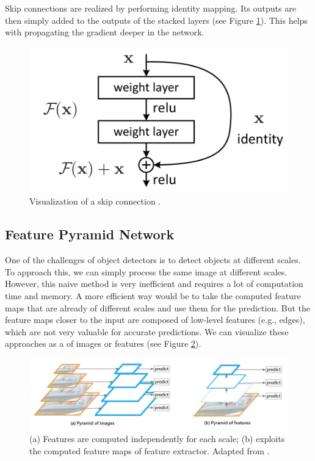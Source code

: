 Skip connections are realized by performing identity mapping. Its outputs are then simply added to the outputs of the stacked layers (see Figure \ref{fig:residual_block}). This helps with propagating the gradient deeper in the network. 

\begin{figure}[h]
    \centering
    \includegraphics[width=0.4\linewidth]{Sources/Figures/residual_block.png}
    \caption{Visualization of a skip connection \cite{resnet}.}
    \label{fig:residual_block}
\end{figure}

\subsection{Feature Pyramid Network}
One of the challenges of object detectors is to detect objects at different scales. To approach this, we can simply process the same image at different scales. However, this naive method is very inefficient and requires a lot of computation time and memory. A more efficient way would be to take the computed feature maps that are already of different scales and use them for the prediction. But the feature maps closer to the input are composed of low-level features (e.g., edges), which are not very valuable for accurate predictions. We can visualize these approaches as a  of images or features (see Figure \ref{fig:pyramids}). 

\begin{figure}[h]
    \centering
    \includegraphics[width=\linewidth]{Sources/Figures/pyramids.png}
    \caption{(a) Features are computed independently for each scale; (b) exploits the computed feature maps of feature extractor. Adapted from \cite{fpn}.}
    \label{fig:pyramids}
\end{figure}

